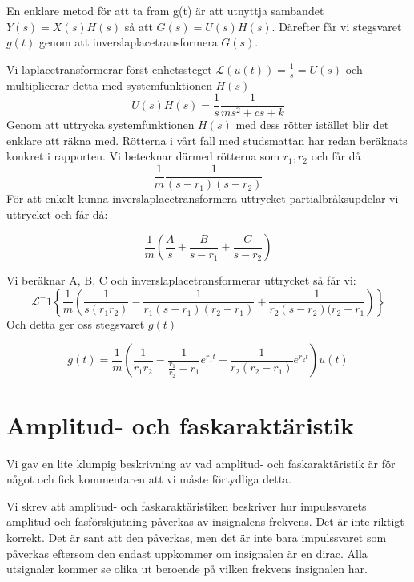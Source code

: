 \documentclass[10pt,a4paper]{article}
\begin{document}
En enklare metod för att ta fram g(t) är att utnyttja sambandet $Y(s) = X(s)H(s)$ så att $G(s) = U(s)H(s)$. Därefter får vi stegsvaret $g(t)$ genom att inverslaplacetransformera $G(s)$.

Vi laplacetransformerar först enhetssteget $\mathcal{L}(u(t)) = \frac{1}{s} = U(s)$ och multiplicerar detta med systemfunktionen $H(s)$
\begin{equation}
U(s)H(s) = \frac{1}{s} \frac{1}{ms^2 + cs + k}
\end{equation}
Genom att uttrycka systemfunktionen $H(s)$ med dess rötter istället blir det enklare att räkna med. Rötterna i vårt fall med studsmattan har redan beräknats konkret i rapporten. Vi betecknar därmed rötterna som $r_1, r_2$ och får då 
\begin{equation}
\frac{1}{m} \frac{1}{(s - r_1) (s - r_2)}
\end{equation}
För att enkelt kunna inverslaplacetransformera uttrycket partialbråksupdelar vi uttrycket och får då:

\begin{equation}
\frac{1}{m} \left(\frac{A}{s} + \frac{B}{s - r_1} + \frac{C}{s - r_2}\right)
\end{equation}

Vi beräknar A, B, C och inverslaplacetransformerar uttrycket så får vi:
\begin{equation}
\mathcal{L}^-1\left\lbrace \frac{1}{m} \left( \frac{1}{s(r_1 r_2)} - \frac{1}{r_1(s-r_1)(r_2-r_1)} + \frac{1}{r_2(s-r_2)(r_2 - r_1}   \right) \right\rbrace
\end{equation}
Och detta ger oss stegsvaret $g(t)$

\begin{equation}
g(t) = \frac{1}{m} \left( \frac{1}{r_1 r_2} - \frac{1}{\frac{r_1}{r_2} - r_1} e^{r_1t} + \frac{1}{r_2(r_2 - r_1)} e^{r_2 t}   \right) u(t)
\end{equation}


\section{Amplitud- och faskaraktäristik}

Vi gav en lite klumpig beskrivning av vad amplitud- och faskaraktäristik är för något och fick kommentaren att vi måste förtydliga detta.

Vi skrev att amplitud- och faskaraktäristiken beskriver hur impulssvarets amplitud och fasförskjutning påverkas av insignalens frekvens. Det är inte riktigt korrekt. Det är sant att den påverkas, men det är inte bara impulssvaret som påverkas eftersom den endast uppkommer om insignalen är en dirac. Alla utsignaler kommer se olika ut beroende på vilken frekvens insignalen har.
\end{document}
